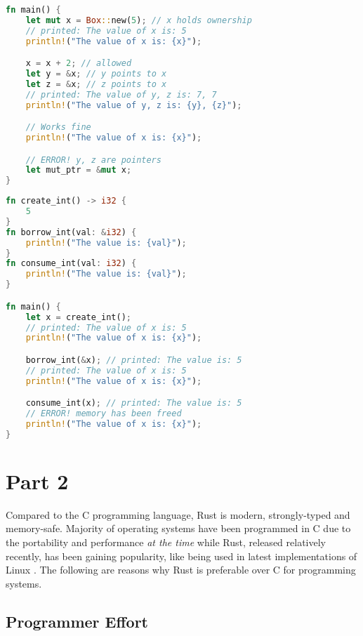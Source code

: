 \documentclass[10pt,a4paper,twocolumn]{article}
\begin{document}
\begin{lstlisting}[language=Rust,caption={Pointers example in Rust}]
fn main() {
    let mut x = Box::new(5); // x holds ownership
    // printed: The value of x is: 5
    println!("The value of x is: {x}");

    x = x + 2; // allowed
    let y = &x; // y points to x
    let z = &x; // z points to x
    // printed: The value of y, z is: 7, 7
    println!("The value of y, z is: {y}, {z}");

    // Works fine
    println!("The value of x is: {x}");

    // ERROR! y, z are pointers
    let mut_ptr = &mut x;
}
\end{lstlisting}

\begin{lstlisting}[language=Rust,caption={Generating, borrowing \& consuming examples}]
fn create_int() -> i32 {
    5
}
fn borrow_int(val: &i32) {
    println!("The value is: {val}");
}
fn consume_int(val: i32) {
    println!("The value is: {val}");
}

fn main() {
    let x = create_int();
    // printed: The value of x is: 5
    println!("The value of x is: {x}");

    borrow_int(&x); // printed: The value is: 5
    // printed: The value of x is: 5
    println!("The value of x is: {x}");

    consume_int(x); // printed: The value is: 5
    // ERROR! memory has been freed
    println!("The value of x is: {x}");
}
\end{lstlisting}

\section*{Part 2}\label{sec:part2}

Compared to the C programming language, Rust is modern, strongly-typed and memory-safe. Majority of operating systems have been programmed in C due to the portability and performance \textit{at the time} while Rust, released relatively recently, has been gaining popularity, like being used in latest implementations of Linux \cite{Linux61O57}. The following are reasons why Rust is preferable over C for programming systems.

\subsection*{Programmer Effort}
\end{document}
